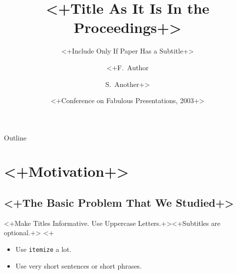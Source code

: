 \documentclass{beamer}
\title[<+Short Paper Title+>] %
{<+Title As It Is In the Proceedings+>}
\subtitle
{<+Include Only If Paper Has a Subtitle+>}
\author[<+Author, Another+>] %
{<+F.~Author\inst{1} \and S.~Another\inst{2}+>}
\institute[<+Universities of Somewhere and Elsewhere+>] %
{<+
  \inst{1}%
  Department of Computer Science\\
  University of Somewhere
  \and
  \inst{2}%
  Department of Theoretical Philosophy\\
  University of Elsewhere+>}
\date[<+CFP 2003+>] %
{<+Conference on Fabulous Presentations, 2003+>}
\begin{document}
\begin{frame}
  \titlepage
\end{frame}

\begin{frame}{Outline}
  \tableofcontents
\end{frame}





\section{<+Motivation+>}

\subsection{<+The Basic Problem That We Studied+>}

\begin{frame}{<+Make Titles Informative. Use Uppercase Letters.+>}{<+Subtitles are optional.+>}
  <+%

  \begin{itemize}
  \item
    Use \texttt{itemize} a lot.
  \item
    Use very short sentences or short phrases.
  \end{itemize}
\end{frame}
\end{document}
